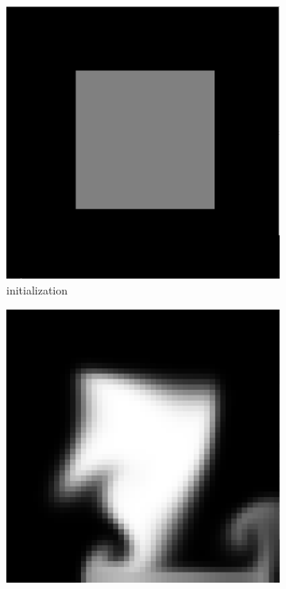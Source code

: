 \begin{figure}[h]
    \centering
    \begin{subfigure}[b]{0.2\textwidth}
        \includegraphics[width=\textwidth]{figures/grid50_init.png}
        \caption{initialization}
    \end{subfigure}
    \hspace{1em}
    \begin{subfigure}[b]{0.2\textwidth}
        \includegraphics[width=\textwidth]{figures/grid50_1.png}

\end{subfigure}
\end{figure}
